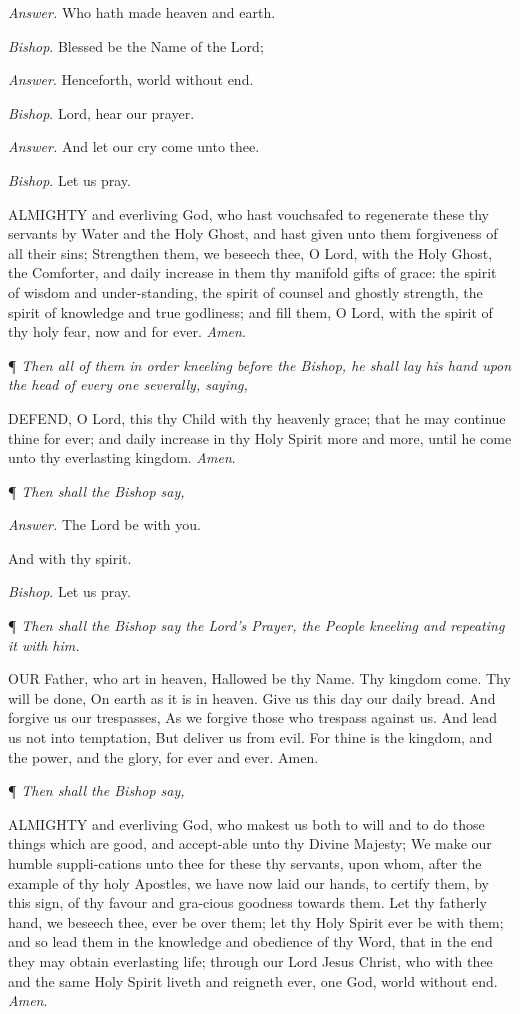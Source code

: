 \emph{Answer.} Who hath made heaven and earth.

\emph{Bishop}. Blessed be the Name of the Lord;

\emph{Answer}. Henceforth, world without end.

\emph{Bishop}. Lord, hear our prayer.

\emph{Answer.} And let our cry come unto thee.

\emph{Bishop}. Let us pray.

ALMIGHTY and everliving
God, who hast vouchsafed to regenerate these thy servants by Water and
the Holy Ghost, and hast given unto them forgiveness of all their sins;
Strengthen them, we beseech thee, O Lord, with the Holy Ghost, the Comforter,
and daily increase in them thy manifold gifts of grace: the spirit of
wisdom and under-standing, the spirit of counsel and ghostly strength,
the spirit of knowledge and true godliness; and fill them, O Lord, with
the spirit of thy holy fear, now and for ever. \emph{Amen}. 

¶
\emph{Then all of them in order kneeling before the Bishop, he shall lay
his hand upon the head of every one severally, saying,}

DEFEND,
O Lord, this thy Child with thy heavenly grace; that he may continue
thine for ever; and daily increase in thy Holy Spirit more and more,
until he come unto thy everlasting kingdom. \emph{Amen}.

¶ \emph{Then shall the Bishop say,}

\emph{Answer.} The Lord be with
you. 

And with thy spirit.

\emph{Bishop}.
Let us pray.

¶ \emph{Then shall the Bishop say the Lord's Prayer, the People kneeling
and repeating it with him.}

OUR
Father, who art in heaven, Hallowed be thy Name. Thy kingdom come. Thy
will be done, On earth as it is in heaven. Give us this day our daily
bread. And forgive us our trespasses, As we forgive those who trespass
against us. And lead us not into temptation, But deliver us from evil.
For thine is the kingdom, and the power, and the glory, for ever and
ever. Amen.

¶ \emph{Then shall the Bishop say,}

ALMIGHTY and everliving
God, who makest us both to will and to do those things which are good,
and accept-able unto thy Divine Majesty; We make our humble suppli-cations
unto thee for these thy servants, upon whom, after the example of thy
holy Apostles, we have now laid our hands, to certify them, by this sign,
of thy favour and gra-cious goodness towards them. Let thy fatherly hand,
we beseech thee, ever be over them; let thy Holy Spirit ever be with them;
and so lead them in the knowledge and obedience of thy Word, that in the
end they may obtain everlasting life; through our Lord Jesus Christ, who
with thee and the same Holy Spirit liveth and reigneth ever, one God,
world without end. \emph{Amen}.

